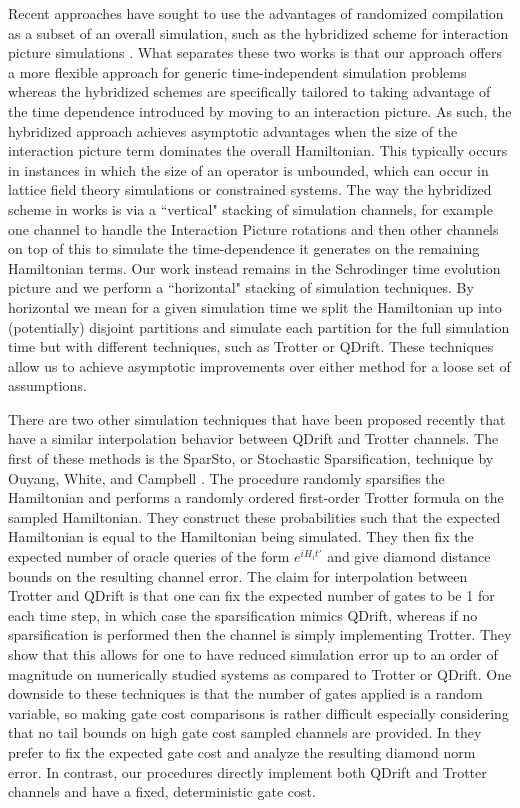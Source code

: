 Recent approaches have sought to use the advantages of randomized compilation as a subset of an overall simulation, such as the hybridized
scheme for interaction picture simulations \cite{hybridized_interaction_pic}. What separates these two works is that our approach offers a
more flexible approach for generic time-independent simulation problems whereas the hybridized schemes are specifically tailored to taking
advantage of the time dependence introduced by moving to an interaction picture. As such, the hybridized approach achieves asymptotic advantages
when the size of the interaction picture term dominates the overall Hamiltonian. This typically occurs in instances in which the size of an operator
is unbounded, which can occur in lattice field theory simulations or constrained systems. The way the hybridized scheme in 
\cite{hybridized_interaction_pic} works is via a ``vertical" stacking of simulation
channels, for example one channel to handle the Interaction Picture rotations and then other channels on top of this to simulate the time-dependence it generates on the remaining Hamiltonian terms. Our work instead remains in the Schrodinger time evolution picture and we 
perform a ``horizontal" stacking of simulation techniques. By horizontal we mean for a given simulation time we split the Hamiltonian up into 
(potentially) disjoint partitions and simulate each partition for the full simulation time but with different techniques, such as Trotter or QDrift.
These techniques allow us to achieve asymptotic improvements over either method for a loose set of assumptions.

There are two other simulation techniques that have been proposed recently that have a similar interpolation behavior between QDrift and Trotter channels. The first of these methods is the SparSto, or Stochastic Sparsification, technique by Ouyang, White, and Campbell \cite{sparsto}. The procedure \cite{sparsto} randomly sparsifies the Hamiltonian and performs a randomly ordered first-order Trotter formula on the sampled Hamiltonian. They construct these probabilities such that the expected Hamiltonian is equal to the Hamiltonian being simulated. They then fix the expected number of oracle queries of the form $e^{i H_i t'}$ and give diamond distance bounds on the resulting channel error. The claim for interpolation between Trotter and QDrift is that one can fix the expected number of gates to be 1 for each time step, in which case the sparsification mimics QDrift, whereas if no sparsification is performed then the channel is simply implementing Trotter. They show that this allows for one to have reduced simulation error up to an order of magnitude on numerically studied systems as compared to Trotter or QDrift. One downside to these techniques is that the number of gates applied is a random variable, so making gate cost comparisons is rather difficult especially considering that no tail bounds on high gate cost sampled channels are provided. In \cite{sparsto} they prefer to fix the expected gate cost and analyze the resulting diamond norm error. In contrast, our procedures directly implement both QDrift and Trotter channels and have a fixed, deterministic gate cost.

